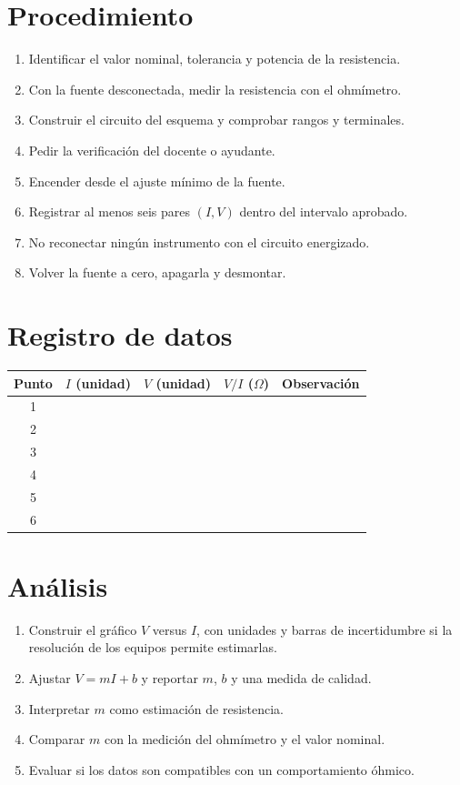\documentclass[11pt,letterpaper]{article}
\begin{document}
\section*{Procedimiento}

\begin{enumerate}
  \item Identificar el valor nominal, tolerancia y potencia de la resistencia.
  \item Con la fuente desconectada, medir la resistencia con el ohmímetro.
  \item Construir el circuito del esquema y comprobar rangos y terminales.
  \item Pedir la verificación del docente o ayudante.
  \item Encender desde el ajuste mínimo de la fuente.
  \item Registrar al menos seis pares \((I,V)\) dentro del intervalo aprobado.
  \item No reconectar ningún instrumento con el circuito energizado.
  \item Volver la fuente a cero, apagarla y desmontar.
\end{enumerate}

\section*{Registro de datos}

\begin{tabularx}{\textwidth}{@{}cXXXX@{}}
\toprule
\textbf{Punto} & \textbf{\(I\) (unidad)} & \textbf{\(V\) (unidad)}
& \textbf{\(V/I\) (\(\Omega\))} & \textbf{Observación}\\
\midrule
1 & & & &\\[5mm]
2 & & & &\\[5mm]
3 & & & &\\[5mm]
4 & & & &\\[5mm]
5 & & & &\\[5mm]
6 & & & &\\[5mm]
\bottomrule
\end{tabularx}

\section*{Análisis}

\begin{enumerate}
  \item Construir el gráfico \(V\) versus \(I\), con unidades y barras de
  incertidumbre si la resolución de los equipos permite estimarlas.
  \item Ajustar \(V=mI+b\) y reportar \(m\), \(b\) y una medida de calidad.
  \item Interpretar \(m\) como estimación de resistencia.
  \item Comparar \(m\) con la medición del ohmímetro y el valor nominal.
  \item Evaluar si los datos son compatibles con un comportamiento óhmico.
\end{enumerate}
\end{document}
